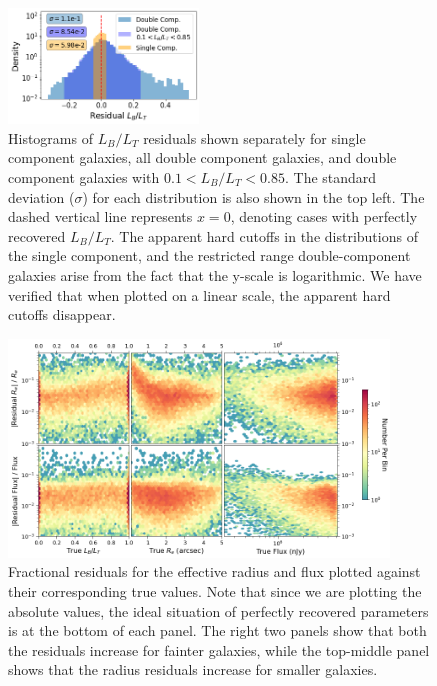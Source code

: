 \documentclass[twocolumn]{aastex63}
\begin{document}
\begin{CJK*}{UTF8}{gbsn}
\begin{figure}[hbt]
    \centering
    \includegraphics[width
    =0.45\textwidth]{residual_hist_bt_sep.png}
    \caption{Histograms of $L_B/L_T$ residuals shown separately for single component galaxies, all double component galaxies, and double component galaxies with $0.1 < L_B/L_T < 0.85$. The standard deviation ($\sigma$) for each distribution is also shown in the top left. The dashed vertical line represents $x = 0$, denoting cases with perfectly recovered $L_B/L_T$. The apparent hard cutoffs in the distributions of the single component, and the restricted range double-component galaxies arise from the fact that the y-scale is logarithmic. We have verified that when plotted on a linear scale, the apparent hard cutoffs disappear.}
    \label{fig:residual_hist_bt_sep}
\end{figure}

\begin{figure}[htb]
    \centering
    \includegraphics[width
    =0.9\textwidth]{2d_hist_residuals_norm.png}
    \caption{Fractional residuals for the effective radius and flux plotted against their corresponding true values. Note that since we are plotting the absolute values, the ideal situation of perfectly recovered parameters is at the bottom of each panel. The right two panels show that both the residuals increase for fainter galaxies, while the top-middle panel shows that the radius residuals increase for smaller galaxies.}
    \label{fig:2d_residual_hists_norm}
\end{figure}



\end{CJK*}
\end{document}
